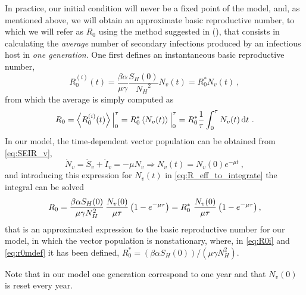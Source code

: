 In practice, our initial condition will never be a fixed point of the
model, and, as mentioned above, we will obtain an approximate basic
reproductive number, to which we will refer as $R_0$ using the method suggested
in (\cite{GimenezRomero2022_PRE}), that consists in
calculating the \textit{average} number of secondary infections produced by
an infectious host in \textit{one generation}. One first defines an
instantaneous basic reproductive number,
\begin{equation}\label{eq:R0i}
    R_0^{(i)}(t)=\frac{\beta\alpha}{\mu\gamma}\frac{S_H(0)}{{N_H}^2}
    N_v(t)=R_0^* N_v(t) \ ,
\end{equation}
from which the average is simply computed as
\begin{equation}\label{eq:R_eff_to_integrate}
    R_0=\left<R_0^{(i)}(t)\right>\Big\rvert_{0}^{\tau}=
    R_0^*\left<N_v(t)\right>\Big\rvert_{0}^{\tau}=
    R_0^*\frac{1}{\tau}\int_0^{\tau}N_v(t)
    \, \mathrm{d} t \ .
\end{equation}
In our model, the time-dependent vector population can be obtained from
\cref{eq:SEIR_v},
\begin{equation}
    \dot{N}_v=\dot{S}_v+\dot{I}_v=-\mu N_v \Longrightarrow
    N_v(t)=N_v(0)e^{-\mu t} \ ,
\end{equation}
and introducing this expression for $N_v(t)$ in
\cref{eq:R_eff_to_integrate} the integral can be solved
\begin{equation}
    R_0={{\beta\alpha S_H(0)}\over{\mu\gamma N_H ^2}}
    \,\frac{N_v(0)}{\mu\tau}\left(1-e^{-\mu\tau}\right)=
    R_0^*\ \frac{N_v(0)}{\mu\tau}\left(1-e^{-\mu\tau}\right) ,
    \label{eq:r0mdef}
\end{equation}
that is an approximated expression to the basic reproductive number for our
model, in which the vector population is nonstationary,
where, in \cref{eq:R0i} and \cref{eq:r0mdef} it has been defined, $R_0^*=
    (\beta\alpha S_H(0))/(\mu\gamma N_H ^2)$.

Note that in our model one generation correspond to one year and that
$N_v(0)$ is reset every year.

